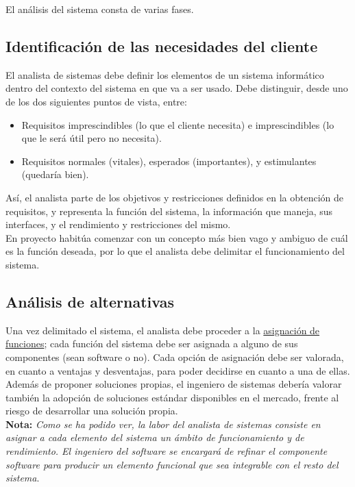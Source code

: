 El análisis del sistema consta de varias fases.

\subsection{Identificación de las necesidades del cliente}

El analista de sistemas debe definir los elementos de un sistema informático dentro del contexto del sistema en que va a ser usado. Debe distinguir, desde uno de los dos siguientes puntos de vista, entre:

\begin{itemize}
    \item Requisitos imprescindibles (lo que el cliente necesita) e imprescindibles (lo que le será útil pero no necesita).
    \item Requisitos normales (vitales), esperados (importantes), y estimulantes (quedaría bien).
\end{itemize}

Así, el analista parte de los objetivos y restricciones definidos en la obtención de requisitos, y representa la función del sistema, la información que maneja, sus interfaces, y el rendimiento y restricciones del mismo.\\

En proyecto habitúa comenzar con un concepto más bien vago y ambiguo de cuál es la función deseada, por lo que el analista debe delimitar el funcionamiento del sistema.

\subsection{Análisis de alternativas}

Una vez delimitado el sistema, el analista debe proceder a la \uline{asignación de funciones}; cada función del sistema debe ser asignada a alguno de sus componentes (sean software o no). Cada opción de asignación debe ser valorada, en cuanto a ventajas y desventajas, para poder decidirse en cuanto a una de ellas.\\

Además de proponer soluciones propias, el ingeniero de sistemas debería valorar también la adopción de soluciones estándar disponibles en el mercado, frente al riesgo de desarrollar una solución propia.\\

\textbf{Nota:} \textit{Como se ha podido ver, la labor del analista de sistemas consiste en asignar a cada elemento del sistema un ámbito de funcionamiento y de rendimiento. El ingeniero del software se encargará de refinar el componente software para producir un elemento funcional que sea integrable con el resto del sistema}.\\

